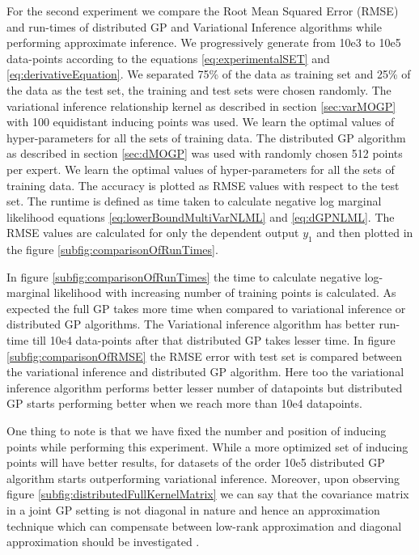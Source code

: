 For the second experiment we compare the Root Mean Squared Error (RMSE) and run-times of distributed GP and Variational Inference algorithms while performing approximate inference. We progressively generate from 10e3 to 10e5 data-points according to the equations \ref{eq:experimentalSET} and \ref{eq:derivativeEquation}. We separated 75\% of the data as training set and 25\% of the data as the test set, the training and test sets were chosen randomly. The variational inference relationship kernel as described in section \ref{sec:varMOGP} with 100 equidistant inducing points was used. We learn the optimal values of hyper-parameters for all the sets of training data. The distributed GP algorithm as described in section \ref{sec:dMOGP} was used with randomly chosen 512 points per expert. We learn the optimal values of hyper-parameters for all the sets of training data. The accuracy is plotted as RMSE values with respect to the test set. The runtime is defined as time taken to calculate negative log marginal likelihood equations \ref{eq:lowerBoundMultiVarNLML} and  \ref{eq:dGPNLML}. The RMSE values are calculated for only the dependent output \(y_{1}\) and then plotted in the figure \ref{subfig:comparisonOfRunTimes}. 

In figure \ref{subfig:comparisonOfRunTimes} the time to calculate negative log-marginal likelihood with increasing number of training points is calculated. As expected the full GP takes more time when compared to variational inference or distributed GP algorithms. The Variational inference algorithm has better run-time till 10e4 data-points after that distributed GP takes lesser time. 
In figure \ref{subfig:comparisonOfRMSE} the RMSE error with test set is compared between the variational inference and distributed GP algorithm. Here too the variational inference algorithm performs better lesser number of datapoints but distributed GP starts performing better when we reach more than 10e4 datapoints. 

One thing to note is that we have fixed the number and position of inducing points while performing this experiment. While a more optimized set of inducing points will have better results, for datasets of the order 10e5 distributed GP algorithm starts outperforming variational inference. Moreover, upon observing figure \ref{subfig:distributedFullKernelMatrix} we can say that the covariance matrix in a joint GP setting is not diagonal in nature and hence an approximation technique which can compensate between low-rank approximation and diagonal approximation should be investigated \cite{march2015askit}.

